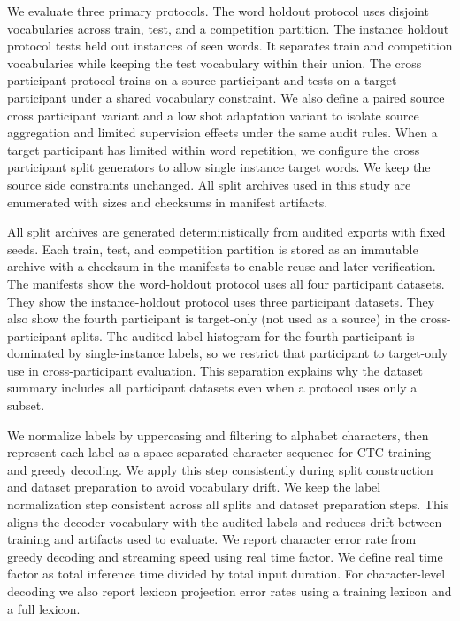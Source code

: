 \documentclass{Interspeech}
\begin{document}
We evaluate three primary protocols. The word holdout protocol uses disjoint vocabularies across train, test, and a competition partition. The instance holdout protocol tests held out instances of seen words. It separates train and competition vocabularies while keeping the test vocabulary within their union. The cross participant protocol trains on a source participant and tests on a target participant under a shared vocabulary constraint. We also define a paired source cross participant variant and a low shot adaptation variant to isolate source aggregation and limited supervision effects under the same audit rules. When a target participant has limited within word repetition, we configure the cross participant split generators to allow single instance target words. We keep the source side constraints unchanged. All split archives used in this study are enumerated with sizes and checksums in manifest artifacts.

All split archives are generated deterministically from audited exports with fixed seeds. Each train, test, and competition partition is stored as an immutable archive with a checksum in the manifests to enable reuse and later verification. The manifests show the word-holdout protocol uses all four participant datasets. They show the instance-holdout protocol uses three participant datasets. They also show the fourth participant is target-only (not used as a source) in the cross-participant splits. The audited label histogram for the fourth participant is dominated by single-instance labels, so we restrict that participant to target-only use in cross-participant evaluation. This separation explains why the dataset summary includes all participant datasets even when a protocol uses only a subset.

We normalize labels by uppercasing and filtering to alphabet characters, then represent each label as a space separated character sequence for CTC training and greedy decoding. We apply this step consistently during split construction and dataset preparation to avoid vocabulary drift.
We keep the label normalization step consistent across all splits and dataset preparation steps. This aligns the decoder vocabulary with the audited labels and reduces drift between training and artifacts used to evaluate.
We report character error rate from greedy decoding and streaming speed using real time factor. We define real time factor as total inference time divided by total input duration. For character-level decoding we also report lexicon projection error rates using a training lexicon and a full lexicon.
\end{document}
